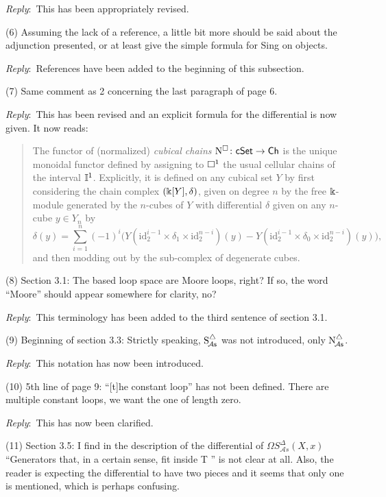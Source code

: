 \documentclass{amsart}
\newcommand{\ar}{\medskip\noindent\textit{Reply}:\ }
\newcommand{\rp}{\medskip\noindent}
\begin{document}
	\ar This has been appropriately revised. 

	\rp (6) Assuming the lack of a reference, a little bit more should be said about the adjunction presented, or at least give the simple formula for Sing on objects.

	\ar References have been added to the beginning of this subsection.

	\rp (7) Same comment as 2 concerning the last paragraph of page 6.

	\ar This has been revised and an explicit formula for the differential is now given.
	It now reads:

	\begin{quote}
		The functor of (normalized) \textit{cubical chains} $\operatorname{N^{\square}} \colon \mathsf{cSet} \to \mathsf{Ch}$ is the unique monoidal functor defined by assigning to $\square^1$ the usual cellular chains of the interval $\mathbb{I}^1$.
		Explicitly, it is defined on any cubical set $Y$ by first considering the chain complex $(\Bbbk[Y], \delta)$, given on degree $n$ by the free $\Bbbk$-module generated by the $n$-cubes of $Y$ with differential $\delta$ given on any $n$-cube $y \in Y_n$ by
		\[
		\delta(y) = \sum_{i=1}^n (-1)^i
		\big(
		Y(\text{id}_2^{i-1} \times \delta_1 \times \text{id}_2^{n-i})(y) -
		Y(\text{id}_2^{i-1} \times \delta_0 \times \text{id}_2^{n-i})(y)
		\big),
		\]
		and then modding out by the sub-complex of degenerate cubes.
	\end{quote}

	\rp (8) Section 3.1: The based loop space are Moore loops, right?
	If so, the word ``Moore'' should appear somewhere for clarity, no?

	\ar This terminology has been added to the third sentence of section 3.1.

	\rp (9) Beginning of section 3.3: Strictly speaking, $\operatorname{S^{\triangle}_{\!{\mathcal{A}\mathsf{s}}}}$ was not introduced, only $\operatorname{N^{\triangle}_{\!{\mathcal{A}\mathsf{s}}}}$.

	\ar This notation has now been introduced. 

	\rp (10) 5th line of page 9: “[t]he constant loop” has not been defined.
	There are multiple constant loops, we want the one of length zero.

	\ar This has now been clarified.

	\rp (11) Section 3.5: I find in the description of the differential of $\Omega S^\Delta_{\mathcal A s}(X, x)$ “Generators that, in a certain sense, fit inside T ” is not clear at all.
	Also, the reader is expecting the differential to have two pieces and it seems that only one is mentioned, which is perhaps confusing.
\end{document}
